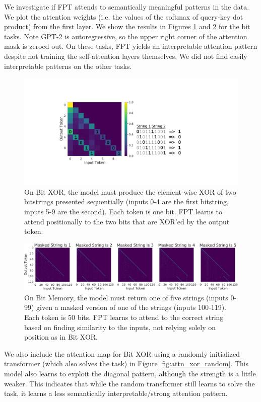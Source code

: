We investigate if FPT attends to semantically meaningful patterns in the data.
We plot the attention weights (i.e. the values of the softmax of query-key dot product) from the first layer.
We show the results in Figures \ref{fig:attn_xor_pretrained} and \ref{fig:attn_memory_pretrained} for the bit tasks.
Note GPT-2 is autoregressive, so the upper right corner of the attention mask is zeroed out.
On these tasks, FPT yields an interpretable attention pattern despite not training the self-attention layers themselves.
We did not find easily interpretable patterns on the other tasks.

\begin{figure}[H]
    \centering
    \includegraphics[width=0.55\linewidth]{figures/attention_maps/xor_pretrained}
    \caption{
        On Bit XOR, the model must produce the element-wise XOR of two bitstrings presented sequentially (inputs 0-4 are the first bitstring, inputs 5-9 are the second).
        Each token is one bit.
        FPT learns to attend positionally to the two bits that are XOR'ed by the output token.
    }
    \label{fig:attn_xor_pretrained}
\end{figure}

\begin{figure}[H]
    \centering
    \includegraphics[width=.95\linewidth]{figures/attention_maps/memory_pretrained}
    \caption{
        On Bit Memory, the model must return one of five strings (inputs 0-99) given a masked version of one of the strings (inputs 100-119).
        Each token is 50 bits.
        FPT learns to attend to the correct string based on finding similarity to the inputs, not relying solely on position as in Bit XOR.
    }
    \label{fig:attn_memory_pretrained}
\end{figure}

We also include the attention map for Bit XOR using a randomly initialized transformer (which also solves the task) in Figure \ref{fig:attn_xor_random}.
This model also learns to exploit the diagonal pattern, although the strength is a little weaker.
This indicates that while the random transformer still learns to solve the task, it learns a less semantically interpretable/strong attention pattern.

